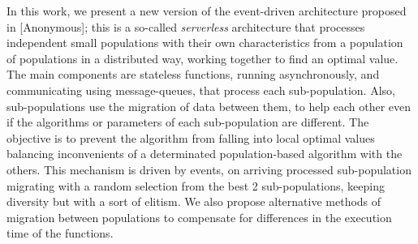\documentclass[runningheads]{llncs}
\begin{document}
In this work, we present a new version of the event-driven architecture
proposed in [Anonymous]; this is a so-called {\em serverless}
architecture that
processes independent small populations with their own characteristics %
from a population of populations in a distributed way, working together to find an optimal value. %
The main components %
are stateless functions,
running asynchronously, %
and communicating using message-queues, that process each
sub-population. %
Also, sub-populations use the migration of data %
between them, to
help each other even if the algorithms or parameters of each sub-population are
different. The objective is to prevent the algorithm from falling into local optimal
values balancing inconvenients of a determinated population-based algorithm with the others. %
This mechanism is driven by events, on arriving processed sub-population migrating with a random selection 
from the best 2 sub-populations, keeping diversity but with a sort of elitism. 
We also
propose alternative methods of migration between populations to compensate for
differences in the execution time of the functions. %


\end{document}

